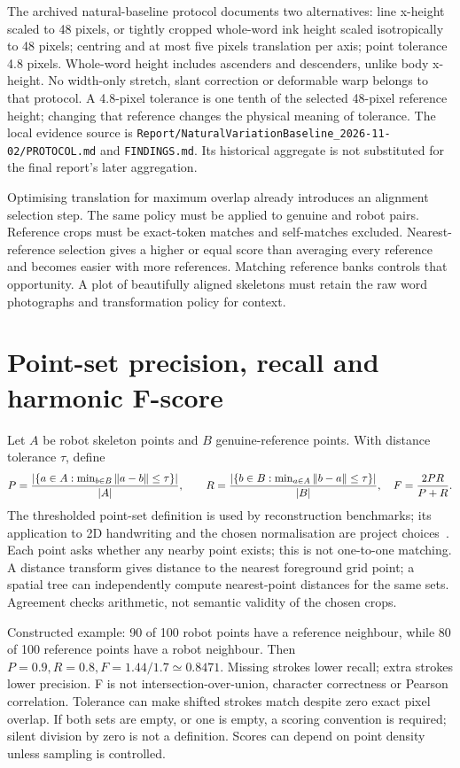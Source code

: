 The archived natural-baseline protocol documents two alternatives: line
x-height scaled to 48 pixels, or tightly cropped whole-word ink height scaled
isotropically to 48 pixels; centring and at most five pixels translation per
axis; point tolerance 4.8 pixels. Whole-word height includes ascenders and
descenders, unlike body x-height. No width-only stretch, slant correction or
deformable warp belongs to that protocol. A 4.8-pixel tolerance is one tenth
of the selected 48-pixel reference height; changing that reference changes
the physical meaning of tolerance. The local evidence source is
\texttt{Report/NaturalVariationBaseline\_2026-11-02/PROTOCOL.md} and
\texttt{FINDINGS.md}. Its historical aggregate is not substituted for the
final report's later aggregation.

Optimising translation for maximum overlap already introduces an alignment
selection step. The same policy must be applied to genuine and robot pairs.
Reference crops must be exact-token matches and self-matches excluded.
Nearest-reference selection gives a higher or equal score than averaging
every reference and becomes easier with more references. Matching reference
banks controls that opportunity. A plot of beautifully aligned skeletons
must retain the raw word photographs and transformation policy for context.

\section{Point-set precision, recall and harmonic F-score}
Let $A$ be robot skeleton points and $B$ genuine-reference points. With
distance tolerance $\tau$, define
\[
P={|\{a\in A:\min_{b\in B}\|a-b\|\le\tau\}|\over|A|},\qquad
R={|\{b\in B:\min_{a\in A}\|b-a\|\le\tau\}|\over|B|},\quad
F={2PR\over P+R}.
\]
The thresholded point-set definition is used by reconstruction benchmarks;
its application to 2D handwriting and the chosen normalisation are project
choices~\cite{tanksmetric}. Each point asks whether any nearby point exists;
this is not one-to-one matching. A distance transform gives distance to the
nearest foreground grid point; a spatial tree can independently compute
nearest-point distances for the same sets. Agreement checks arithmetic,
not semantic validity of the chosen crops.

Constructed example: 90 of 100 robot points have a reference neighbour,
while 80 of 100 reference points have a robot neighbour. Then
$P=0.9,R=0.8,F=1.44/1.7\simeq0.8471$. Missing strokes lower recall;
extra strokes lower precision. F is not intersection-over-union, character
correctness or Pearson correlation. Tolerance can make shifted strokes
match despite zero exact pixel overlap. If both sets are empty, or one is
empty, a scoring convention is required; silent division by zero is not a
definition. Scores can depend on point density unless sampling is controlled.

